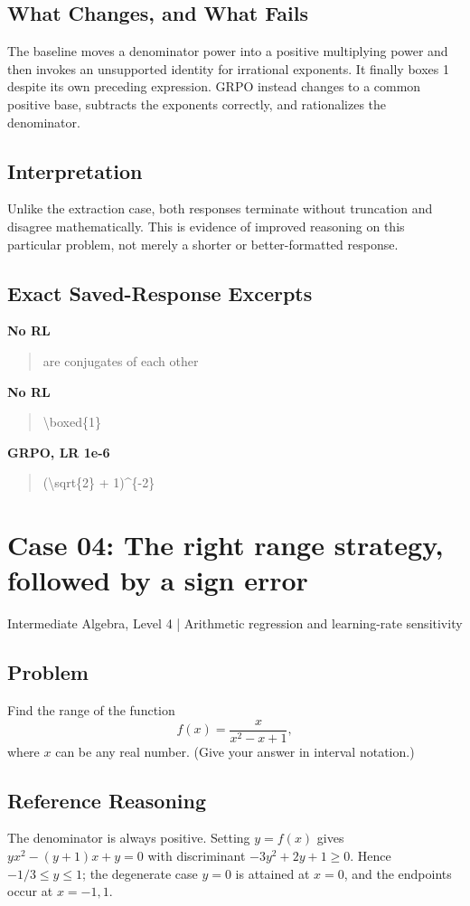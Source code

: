 \documentclass[10pt,letterpaper]{article}
\begin{document}
\subsection*{What Changes, and What Fails}
The baseline moves a denominator power into a positive multiplying power and then invokes an unsupported identity for irrational exponents. It finally boxes 1 despite its own preceding expression. GRPO instead changes to a common positive base, subtracts the exponents correctly, and rationalizes the denominator.
\subsection*{Interpretation}
Unlike the extraction case, both responses terminate without truncation and disagree mathematically. This is evidence of improved reasoning on this particular problem, not merely a shorter or better-formatted response.
\subsection*{Exact Saved-Response Excerpts}
\textbf{No RL}
\begin{quote}\small\raggedright are conjugates of each other\end{quote}
\textbf{No RL}
\begin{quote}\small\raggedright \textbackslash{}boxed\{1\}\end{quote}
\textbf{GRPO, LR 1e-6}
\begin{quote}\small\raggedright (\textbackslash{}sqrt\{2\} + 1)\textasciicircum{}\{-2\}\end{quote}
\clearpage\section*{Case 04: The right range strategy, followed by a sign error}
Intermediate Algebra, Level 4 | Arithmetic regression and learning-rate sensitivity
\subsection*{Problem}
Find the range of the function \[f(x) = \frac{x}{x^2-x+1},\]where $x$ can be any real number. (Give your answer in interval notation.)
\subsection*{Reference Reasoning}
The denominator is always positive. Setting $y=f(x)$ gives $yx^2-(y+1)x+y=0$ with discriminant $-3y^2+2y+1\geq0$. Hence $-1/3\leq y\leq1$; the degenerate case $y=0$ is attained at $x=0$, and the endpoints occur at $x=-1,1$.
\end{document}
